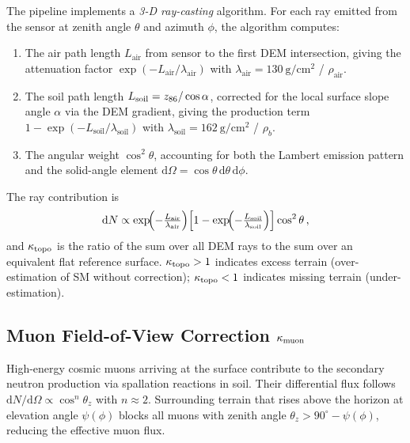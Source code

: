 The pipeline implements a \emph{3-D ray-casting} algorithm.
For each ray emitted from the sensor at zenith angle $\theta$ and
azimuth $\phi$, the algorithm computes:
\begin{enumerate}[nosep]
  \item The air path length $L_\mathrm{air}$ from sensor to the first
        DEM intersection, giving the attenuation factor
        $\exp(-L_\mathrm{air}/\lambda_\mathrm{air})$ with
        $\lambda_\mathrm{air} = \SI{130}{\gram\per\centi\metre\squared}$
        / $\rho_\mathrm{air}$.
  \item The soil path length $L_\mathrm{soil} = z_{86}/\cos\alpha$,
        corrected for the local surface slope angle $\alpha$ via the
        DEM gradient, giving the production term
        $1-\exp(-L_\mathrm{soil}/\lambda_\mathrm{soil})$ with
        $\lambda_\mathrm{soil} = \SI{162}{\gram\per\centi\metre\squared}$
        / $\rho_b$.
  \item The angular weight $\cos^2\theta$, accounting for both the
        Lambert emission pattern and the solid-angle element
        $\mathrm{d}\Omega = \cos\theta\,\mathrm{d}\theta\,\mathrm{d}\phi$.
\end{enumerate}
The ray contribution is
\begin{equation}
  \mathrm{d}N \propto
    \exp\!\Bigl(-\tfrac{L_\mathrm{air}}{\lambda_\mathrm{air}}\Bigr)
    \Bigl[1-\exp\!\Bigl(-\tfrac{L_\mathrm{soil}}{\lambda_\mathrm{soil}}\Bigr)\Bigr]
    \cos^2\theta\,,
  \label{eq:ray}
\end{equation}
and $\kappa_\mathrm{topo}$ is the ratio of the sum over all DEM rays to the sum over
an equivalent flat reference surface.
$\kappa_\mathrm{topo} > 1$ indicates excess terrain (over-estimation of SM without
correction); $\kappa_\mathrm{topo} < 1$ indicates missing terrain (under-estimation).

\subsection{Muon Field-of-View Correction \texorpdfstring{$\kappa_\mathrm{muon}$}{kappa\_muon}}
\label{sec:kappa_muon}

High-energy cosmic muons arriving at the surface contribute to the
secondary neutron production via spallation reactions in soil.
Their differential flux follows $\mathrm{d}N/\mathrm{d}\Omega
\propto \cos^n\theta_z$ with $n \approx 2$.
Surrounding terrain that rises above the horizon at elevation angle
$\psi(\phi)$ blocks all muons with zenith angle
$\theta_z > 90^\circ - \psi(\phi)$, reducing the effective muon flux.

